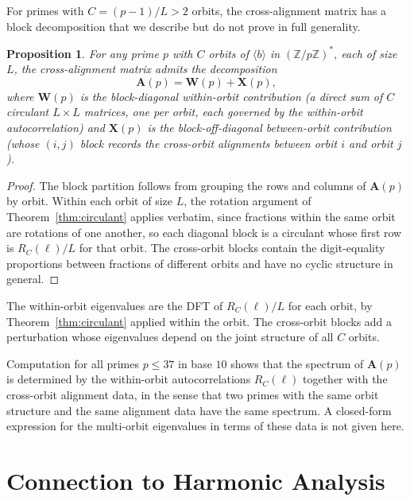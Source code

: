 \documentclass[12pt]{amsart}
\newtheorem{proposition}[theorem]{Proposition}
\theoremstyle{definition}
\theoremstyle{remark}
\begin{document}
For primes with $C = (p{-}1)/L > 2$ orbits, the cross-alignment
matrix has a block decomposition that we describe but do not
prove in full generality.

\begin{proposition}\label{prop:block-decomp}
For any prime $p$ with $C$ orbits of $\langle b \rangle$
in $(\mathbb{Z}/p\mathbb{Z})^*$, each of size $L$, the
cross-alignment matrix admits the decomposition
\[
\mathbf{A}(p) = \mathbf{W}(p) + \mathbf{X}(p),
\]
where $\mathbf{W}(p)$ is the block-diagonal within-orbit
contribution (a direct sum of $C$ circulant $L \times L$
matrices, one per orbit, each governed by the within-orbit
autocorrelation) and $\mathbf{X}(p)$ is the
block-off-diagonal between-orbit contribution (whose
$(i,j)$ block records the cross-orbit alignments between
orbit $i$ and orbit $j$).
\end{proposition}

\begin{proof}
The block partition follows from grouping the rows and
columns of $\mathbf{A}(p)$ by orbit. Within each orbit
of size $L$, the rotation argument of
Theorem~\ref{thm:circulant} applies verbatim, since
fractions within the same orbit are rotations of one
another, so each diagonal block is a circulant whose first
row is $R_C(\ell)/L$ for that orbit.
The cross-orbit blocks contain the digit-equality
proportions between fractions of different orbits and have
no cyclic structure in general.
\end{proof}

The within-orbit eigenvalues are the DFT of $R_C(\ell)/L$
for each orbit, by Theorem~\ref{thm:circulant} applied
within the orbit. The cross-orbit blocks add a perturbation
whose eigenvalues depend on the joint structure of all
$C$ orbits.

Computation for all primes $p \le 37$ in base $10$ shows
that the spectrum of $\mathbf{A}(p)$ is determined by the
within-orbit autocorrelations $R_C(\ell)$ together with the
cross-orbit alignment data, in the sense that two primes
with the same orbit structure and the same alignment data
have the same spectrum. A closed-form expression for the
multi-orbit eigenvalues in terms of these data is not
given here.

\section{Connection to Harmonic Analysis}
\end{document}
